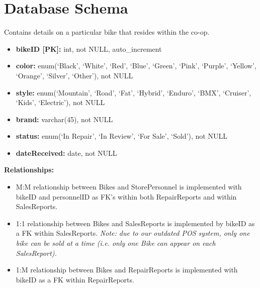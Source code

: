 \documentclass{article}
\begin{document}
\vspace{0.5cm}

\section{Database Schema}

\begin{tcolorbox}[colback=secondarycolor, colframe=primarycolor, title=\textbf{Bikes Table}]
Contains details on a particular bike that resides within the co-op.
\vspace{0.2cm}

\begin{itemize}
  \item \textbf{bikeID [PK]:} int, not NULL, auto\_increment
  \item \textbf{color:} enum(`Black', `White', `Red', `Blue', `Green', `Pink', `Purple', `Yellow', `Orange', `Silver', `Other'), not NULL 
  \item \textbf{style:} enum(`Mountain', `Road', `Fat', `Hybrid', `Enduro', `BMX', `Cruiser', `Kids', `Electric'), not NULL
  \item \textbf{brand:} varchar(45), not NULL
  \item \textbf{status:} enum(`In Repair', `In Review', `For Sale', `Sold'), not NULL
  \item \textbf{dateReceived:} date, not NULL
\end{itemize}
\vspace{0.2cm}

\textbf{Relationships:}
\vspace{0.2cm}
\begin{itemize}
  \item M:M relationship between Bikes and StorePersonnel is implemented with bikeID and personnelID as FK's within both RepairReports and within SalesReports.
  \item 1:1 relationship between Bikes and SalesReports is implemented by bikeID as a FK within SalesReports. \textit{Note: due to our outdated POS system, only one bike can be sold at a time (i.e. only one Bike can appear on each SalesReport).}
  \item 1:M relationship between Bikes and RepairReports is implemented with bikeID as a FK within RepairReports.
\end{itemize}
\end{tcolorbox}
\end{document}
